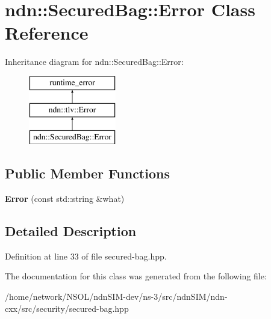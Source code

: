 \hypertarget{classndn_1_1SecuredBag_1_1Error}{}\section{ndn\+:\+:Secured\+Bag\+:\+:Error Class Reference}
\label{classndn_1_1SecuredBag_1_1Error}
Inheritance diagram for ndn\+:\+:Secured\+Bag\+:\+:Error\+:\begin{figure}[H]
\begin{center}
\leavevmode
\includegraphics[height=3.000000cm]{classndn_1_1SecuredBag_1_1Error}
\end{center}
\end{figure}
\subsection*{Public Member Functions}
\begin{DoxyCompactItemize}
\item 
{\bfseries Error} (const std\+::string \&what)\hypertarget{classndn_1_1SecuredBag_1_1Error_a7d90aac549d5070e76e88f55e51c51a0}{}\label{classndn_1_1SecuredBag_1_1Error_a7d90aac549d5070e76e88f55e51c51a0}

\end{DoxyCompactItemize}


\subsection{Detailed Description}


Definition at line 33 of file secured-\/bag.\+hpp.



The documentation for this class was generated from the following file\+:\begin{DoxyCompactItemize}
\item 
/home/network/\+N\+S\+O\+L/ndn\+S\+I\+M-\/dev/ns-\/3/src/ndn\+S\+I\+M/ndn-\/cxx/src/security/secured-\/bag.\+hpp\end{DoxyCompactItemize}
